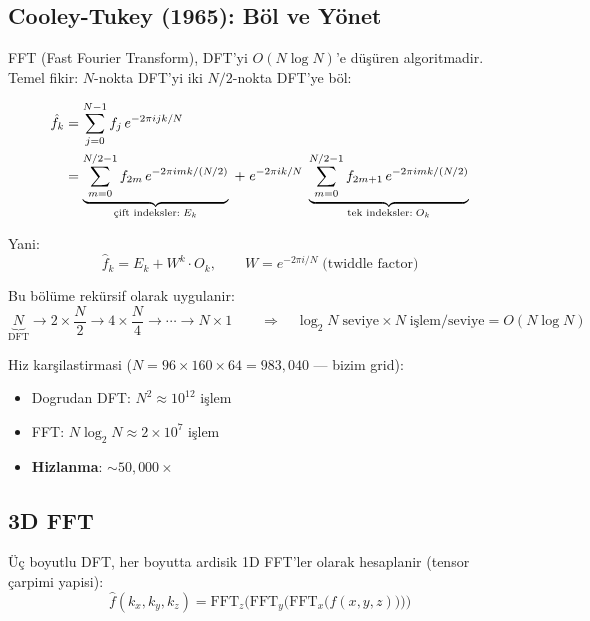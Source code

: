 \subsection{Cooley-Tukey (1965): Böl ve Yönet}

FFT (Fast Fourier Transform), DFT'yi $O(N \log N)$'e düşüren algoritmadir.
Temel fikir: $N$-nokta DFT'yi iki $N/2$-nokta DFT'ye böl:

\begin{align}
\hat{f}_k &= \sum_{j=0}^{N-1} f_j\, e^{-2\pi i jk/N} \notag \\
&= \underbrace{\sum_{m=0}^{N/2-1} f_{2m}\, e^{-2\pi i mk/(N/2)}}_{\text{{çift indeksler}}: \; E_k}
\;+\;
e^{-2\pi ik/N}\;\underbrace{\sum_{m=0}^{N/2-1} f_{2m+1}\, e^{-2\pi i mk/(N/2)}}_{\text{tek indeksler}: \; O_k}
\label{eq:fft_decomp}
\end{align}

Yani:
\begin{equation}
\hat{f}_k = E_k + W^k \cdot O_k, \qquad W = e^{-2\pi i / N}\;\text{(twiddle factor)}
\label{eq:butterfly}
\end{equation}

Bu bölüme rekürsif olarak uygulanir:
\begin{equation}
\underbrace{N}_{\text{DFT}} \to 2\times\frac{N}{2} \to 4\times\frac{N}{4} \to \cdots \to N\times 1
\qquad \Rightarrow \quad \log_2 N \;\text{seviye} \times N \;\text{işlem/seviye} = O(N\log N)
\end{equation}

\begin{example}
Hiz karşilastirmasi ($N = 96 \times 160 \times 64 = 983{,}040$ --- bizim grid):
\begin{itemize}
\item Dogrudan DFT: $N^2 \approx 10^{12}$ işlem
\item FFT: $N\log_2 N \approx 2\times10^7$ işlem
\item \textbf{Hizlanma}: $\sim 50{,}000\times$
\end{itemize}
\end{example}

\subsection{3D FFT}

Üç boyutlu DFT, her boyutta ardisik 1D FFT'ler olarak hesaplanir (tensor çarpimi yapisi):
\begin{equation}
\hat{f}(k_x, k_y, k_z) = \text{FFT}_z\!\Big(\text{FFT}_y\!\big(\text{FFT}_x\!\big(f(x,y,z)\big)\big)\Big)
\end{equation}

